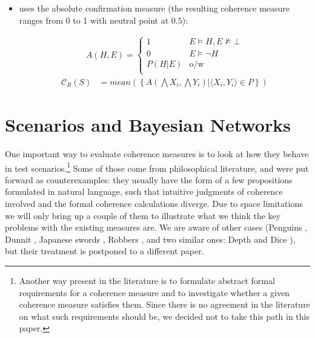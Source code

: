 \documentclass[10pt,]{scrartcl}
\begin{document}
\begin{itemize}


\item  \citet{Roche2013Coherence} uses the
absolute confirmation measure (the resulting coherence measure ranges from 0 to 1 with neutral point at $0.5$): 

\begin{align*}
    A(H,E) = \begin{cases}
    1 & E\models H, E\not \models \bot \\
    0 & E \models \neg H\\
    P(H|E) & \mbox{o/w} \\
    \end{cases}
\end{align*}
\begin{align}
\tag{Roche}  
    \mathcal{C}_{R}(S) & =
mean\left(\left\{A(\bigwedge X_i, \bigwedge Y_i) | \langle X_i, Y_i\rangle \in P\right\} \right) 
\end{align}



\end{itemize}











\section{Scenarios and Bayesian Networks}\label{sec:senariosAndBns}


One important way to evaluate coherence measures is to look at how they behave in test scenarios.\footnote{Another way present in the literature is to formulate abstract formal requirements for a coherence measure and to investigate whether a given coherence measure satisfies them. Since there is no agreement in the literature on what such requirements should be, we decided not to take this path in this paper.}
 Some of those come from philosophical literature, and were put forward as counterexamples: they usually have the form of a few propositions formulated in natural language, such that intuitive judgments of coherence involved and the formal coherence calculations  diverge.  Due to space limitations we will only bring up a couple of them to illustrate what we think the key problems with the existing measures are. We are aware of other cases (Penguins \citep{bovens2004bayesian,Meijs2007Alleged},  Dunnit \citep{Merricks1995}, 
Japanese swords \citep{Meijs2007Alleged}, 
Robbers \citep{Siebel2004On-Fitelsons-me},
and two similar ones: Depth and 
Dice  \citep{Akiba2000Shogenjis,Shogenji2001Reply,Schippers2019General}), but their  treatment is postponed to a different paper.
\end{document}
